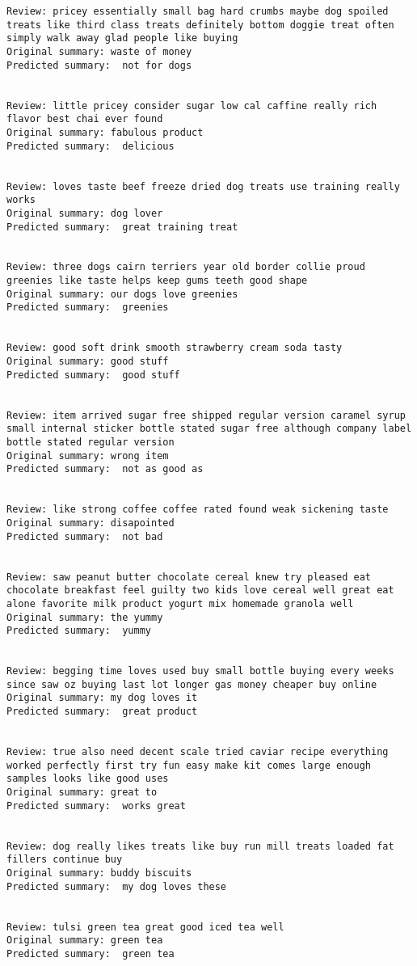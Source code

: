 \documentclass[11pt]{article}
\begin{document}
\begin{Verbatim}[commandchars=\\\{\}]
Review: pricey essentially small bag hard crumbs maybe dog spoiled treats like third class treats definitely bottom doggie treat often simply walk away glad people like buying 
Original summary: waste of money 
Predicted summary:  not for dogs


Review: little pricey consider sugar low cal caffine really rich flavor best chai ever found 
Original summary: fabulous product 
Predicted summary:  delicious


Review: loves taste beef freeze dried dog treats use training really works 
Original summary: dog lover 
Predicted summary:  great training treat


Review: three dogs cairn terriers year old border collie proud greenies like taste helps keep gums teeth good shape 
Original summary: our dogs love greenies 
Predicted summary:  greenies


Review: good soft drink smooth strawberry cream soda tasty 
Original summary: good stuff 
Predicted summary:  good stuff


Review: item arrived sugar free shipped regular version caramel syrup small internal sticker bottle stated sugar free although company label bottle stated regular version 
Original summary: wrong item 
Predicted summary:  not as good as


Review: like strong coffee coffee rated found weak sickening taste 
Original summary: disapointed 
Predicted summary:  not bad


Review: saw peanut butter chocolate cereal knew try pleased eat chocolate breakfast feel guilty two kids love cereal well great eat alone favorite milk product yogurt mix homemade granola well 
Original summary: the yummy 
Predicted summary:  yummy


Review: begging time loves used buy small bottle buying every weeks since saw oz buying last lot longer gas money cheaper buy online 
Original summary: my dog loves it 
Predicted summary:  great product


Review: true also need decent scale tried caviar recipe everything worked perfectly first try fun easy make kit comes large enough samples looks like good uses 
Original summary: great to 
Predicted summary:  works great


Review: dog really likes treats like buy run mill treats loaded fat fillers continue buy 
Original summary: buddy biscuits 
Predicted summary:  my dog loves these


Review: tulsi green tea great good iced tea well 
Original summary: green tea 
Predicted summary:  green tea



\end{Verbatim}
\end{document}
